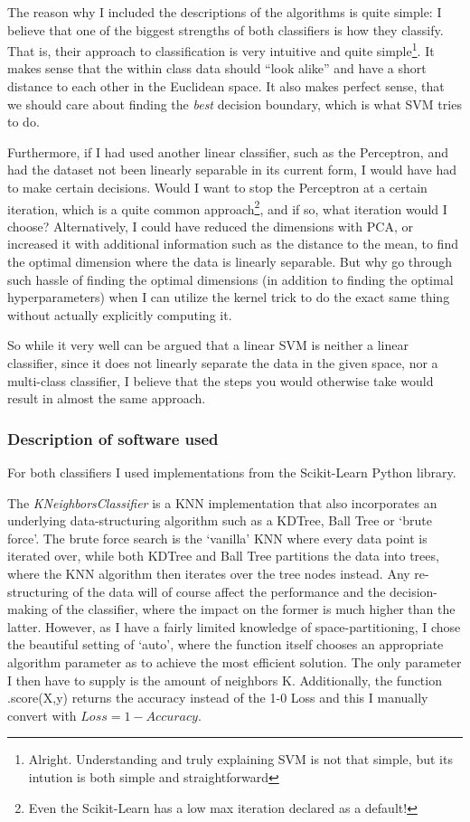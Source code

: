 \documentclass{article}
\theoremstyle{plain}
\theoremstyle{nonumberplain}
\begin{document}
The reason why I included the descriptions of the algorithms is quite simple: I believe that one of the biggest strengths of both classifiers is how they classify. 
That is, their approach to classification is very intuitive and quite simple\footnote{Alright. Understanding and truly explaining SVM is not that simple, but its intution is both simple and straightforward}.
It makes sense that the within class data should ``look alike'' and have a short distance to each other in the Euclidean space.
It also makes perfect sense, that we should care about finding the \textit{best} decision boundary, which is what SVM tries to do. 

Furthermore, if I had used another linear classifier, such as the Perceptron, and had the dataset not been linearly separable in its current form, I would have had to make certain decisions.
Would I want to stop the Perceptron at a certain iteration, which is a quite common approach\footnote{Even the Scikit-Learn has a low max iteration declared as a default!}, and if so, what iteration would I choose?
Alternatively, I could have reduced the dimensions with PCA, or increased it with additional information such as the distance to the mean, to find the optimal dimension where the data is linearly separable. 
But why go through such hassle of finding the optimal dimensions (in addition to finding the optimal hyperparameters) when I can utilize the kernel trick to do the exact same thing without actually explicitly computing it.

So while it very well can be argued that a linear SVM is neither a linear classifier, since it does not linearly separate the data in the given space, nor a multi-class classifier, I believe that the steps you would otherwise take would result in almost the same approach. 


\subsubsection{Description of software used}
For both classifiers I used implementations from the Scikit-Learn Python library\cite{website:sklearn}. \medskip

The \textit{KNeighborsClassifier} is a KNN implementation that also incorporates an underlying data-structuring algorithm such as a KDTree, Ball Tree or `brute force'\cite{website:knn-sklearn}. 
The brute force search is the `vanilla' KNN where every data point is iterated over, while both KDTree and Ball Tree partitions the data into trees, where the KNN algorithm then iterates over the tree nodes instead.
Any re-structuring of the data will of course affect the performance and the decision-making of the classifier, where the impact on the former is much higher than the latter. 
However, as I have a fairly limited knowledge of space-partitioning, I chose the beautiful setting of `auto', where the function itself chooses an appropriate algorithm parameter as to achieve the most efficient solution. The only parameter I then have to supply is the amount of neighbors K. Additionally, the function .score(X,y) returns the accuracy instead of the 1-0 Loss and this I manually convert with $Loss = 1 - Accuracy$. \medskip
\end{document}
